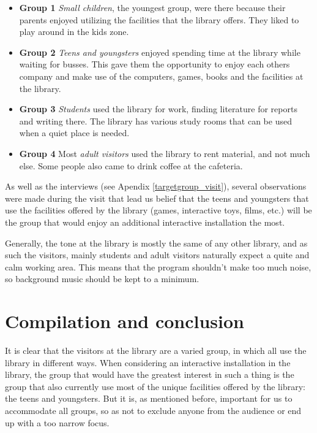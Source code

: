 \begin{itemize}

\item \textbf{Group 1} \textit{Small children}, the youngest group, were there because their parents enjoyed utilizing the facilities that the library offers. They liked to play around in the kids zone.

\item \textbf{Group 2} \textit{Teens and youngsters} enjoyed spending time at the library while waiting for busses. This gave them the opportunity to enjoy each others company and make use of the computers, games, books and the facilities at the library.

\item \textbf{Group 3} \textit{Students} used the library for work, finding literature for reports and writing there. The library has various study rooms that can be used when a quiet place is needed.

\item \textbf{Group 4} Most \textit{adult visitors} used the library to rent material, and not much else. Some people also came to drink coffee at the cafeteria.

\end{itemize}

As well as the interviews (see Apendix \ref{targetgroup_visit}), several observations were made during the visit that lead us belief that the teens and youngsters that use the facilities offered by the library (games, interactive toys, films, etc.) will be the group that would enjoy an additional interactive installation the most.

Generally, the tone at the library is mostly the same of any other library, and as such the visitors, mainly students and adult visitors naturally expect a quite and calm working area. This means that the program shouldn't make too much noise, so background music should be kept to a minimum.

\section{Compilation and conclusion}

It is clear that the visitors at the library are a varied group, in which all use the library in different ways. When considering an interactive installation in the library, the group that would have the greatest interest in such a thing is the group that also currently use most of the unique facilities offered by the library: the teens and youngsters. But it is, as mentioned before, important for us to accommodate all groups, so as not to exclude anyone from the audience or end up with a too narrow focus.

